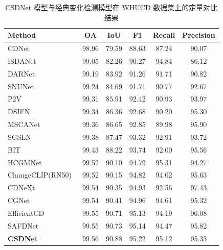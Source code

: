 \begin{table}[!htb]
\centering
\caption{CSDNet 模型与经典变化检测模型在 WHUCD 数据集上的定量对比结果}
\label{tab:csdnet_whucd}
\begin{tabular}{l c c c c c}
\toprule
Method & OA & IoU & F1 & Recall & Precision \\
\midrule
CDNet~\cite{Alcantarilla2016StreetviewCD} & 98.96 & 79.59 & 88.63 & 87.24 & 90.07 \\
ISDANet~\cite{h_ren_interactive_2025} & 99.05 & 82.26 & 90.27 & 94.84 & 86.12 \\
DARNet~\cite{li_densely_2022} & 99.19 & 83.92 & 91.26 & 91.71 & 90.82 \\
SNUNet~\cite{Fang2021SNUNetCDAD} & 99.24 & 84.69 & 91.71 & 90.77 & 92.67 \\
P2V~\cite{lin_transition_2023} & 99.31 & 85.91 & 92.42 & 90.93 & 93.97 \\
DSIFN~\cite{Zhang2020ADS} & 99.34 & 86.36 & 92.68 & 90.20 & 95.30 \\
MSCANet~\cite{m_liu_cnn-transformer_2022} & 99.36 & 86.65 & 92.85 & 89.98 & 95.90 \\
SGSLN~\cite{zhao_exchanging_2023} & 99.38 & 87.47 & 93.32 & 92.91 & 93.72 \\
BIT~\cite{chen_remote_2022} & 99.43 & 88.22 & 93.74 & 92.00 & 95.56 \\
HCGMNet~\cite{Han2023HCGMNetAH} & 99.52 & 90.10 & 94.79 & 95.31 & 94.27 \\
ChangeCLIP(RN50)~\cite{dong2024changeclip} & 99.52 & 90.15 & 94.82 & 94.02 & 95.63 \\
CDNeXt~\cite{wei_robust_2024} & 99.54 & 90.35 & 94.93 & 92.56 & 97.43 \\
CGNet~\cite{han_change_2023} & 99.54 & 90.41 & 94.96 & 94.61 & 95.32 \\
EfficientCD~\cite{dong_efficientcd_2024} & 99.55 & 90.71 & 95.13 & 94.19 & 96.08 \\
SAFDNet~\cite{Fu2025BeyondCD} & 99.55 & 90.73 & 95.14 & 94.47 & 95.82 \\
\textbf{CSDNet} & 99.56 & 90.88 & 95.22 & 95.12 & 95.33 \\
\bottomrule
\end{tabular}%
\end{table}


